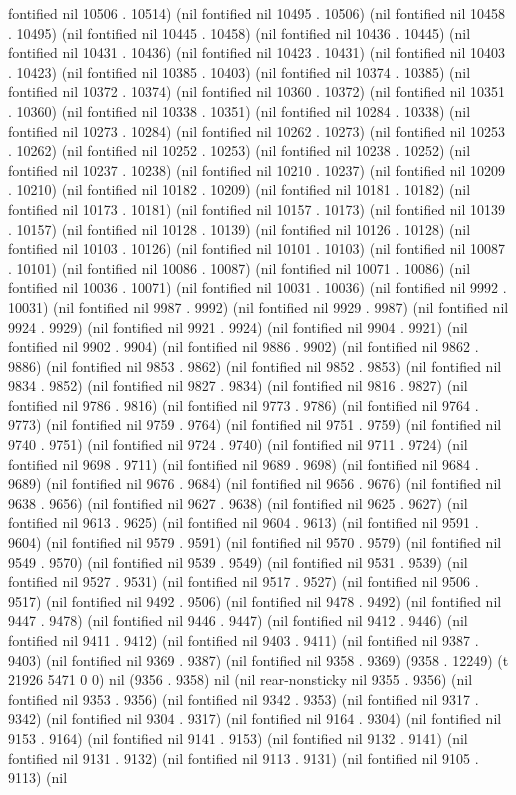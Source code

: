 fontified nil 10506 . 10514) (nil fontified nil 10495 . 10506) (nil fontified nil 10458 . 10495) (nil fontified nil 10445 . 10458) (nil fontified nil 10436 . 10445) (nil fontified nil 10431 . 10436) (nil fontified nil 10423 . 10431) (nil fontified nil 10403 . 10423) (nil fontified nil 10385 . 10403) (nil fontified nil 10374 . 10385) (nil fontified nil 10372 . 10374) (nil fontified nil 10360 . 10372) (nil fontified nil 10351 . 10360) (nil fontified nil 10338 . 10351) (nil fontified nil 10284 . 10338) (nil fontified nil 10273 . 10284) (nil fontified nil 10262 . 10273) (nil fontified nil 10253 . 10262) (nil fontified nil 10252 . 10253) (nil fontified nil 10238 . 10252) (nil fontified nil 10237 . 10238) (nil fontified nil 10210 . 10237) (nil fontified nil 10209 . 10210) (nil fontified nil 10182 . 10209) (nil fontified nil 10181 . 10182) (nil fontified nil 10173 . 10181) (nil fontified nil 10157 . 10173) (nil fontified nil 10139 . 10157) (nil fontified nil 10128 . 10139) (nil fontified nil 10126 . 10128) (nil fontified nil 10103 . 10126) (nil fontified nil 10101 . 10103) (nil fontified nil 10087 . 10101) (nil fontified nil 10086 . 10087) (nil fontified nil 10071 . 10086) (nil fontified nil 10036 . 10071) (nil fontified nil 10031 . 10036) (nil fontified nil 9992 . 10031) (nil fontified nil 9987 . 9992) (nil fontified nil 9929 . 9987) (nil fontified nil 9924 . 9929) (nil fontified nil 9921 . 9924) (nil fontified nil 9904 . 9921) (nil fontified nil 9902 . 9904) (nil fontified nil 9886 . 9902) (nil fontified nil 9862 . 9886) (nil fontified nil 9853 . 9862) (nil fontified nil 9852 . 9853) (nil fontified nil 9834 . 9852) (nil fontified nil 9827 . 9834) (nil fontified nil 9816 . 9827) (nil fontified nil 9786 . 9816) (nil fontified nil 9773 . 9786) (nil fontified nil 9764 . 9773) (nil fontified nil 9759 . 9764) (nil fontified nil 9751 . 9759) (nil fontified nil 9740 . 9751) (nil fontified nil 9724 . 9740) (nil fontified nil 9711 . 9724) (nil fontified nil 9698 . 9711) (nil fontified nil 9689 . 9698) (nil fontified nil 9684 . 9689) (nil fontified nil 9676 . 9684) (nil fontified nil 9656 . 9676) (nil fontified nil 9638 . 9656) (nil fontified nil 9627 . 9638) (nil fontified nil 9625 . 9627) (nil fontified nil 9613 . 9625) (nil fontified nil 9604 . 9613) (nil fontified nil 9591 . 9604) (nil fontified nil 9579 . 9591) (nil fontified nil 9570 . 9579) (nil fontified nil 9549 . 9570) (nil fontified nil 9539 . 9549) (nil fontified nil 9531 . 9539) (nil fontified nil 9527 . 9531) (nil fontified nil 9517 . 9527) (nil fontified nil 9506 . 9517) (nil fontified nil 9492 . 9506) (nil fontified nil 9478 . 9492) (nil fontified nil 9447 . 9478) (nil fontified nil 9446 . 9447) (nil fontified nil 9412 . 9446) (nil fontified nil 9411 . 9412) (nil fontified nil 9403 . 9411) (nil fontified nil 9387 . 9403) (nil fontified nil 9369 . 9387) (nil fontified nil 9358 . 9369) (9358 . 12249) (t 21926 5471 0 0) nil (9356 . 9358) nil (nil rear-nonsticky nil 9355 . 9356) (nil fontified nil 9353 . 9356) (nil fontified nil 9342 . 9353) (nil fontified nil 9317 . 9342) (nil fontified nil 9304 . 9317) (nil fontified nil 9164 . 9304) (nil fontified nil 9153 . 9164) (nil fontified nil 9141 . 9153) (nil fontified nil 9132 . 9141) (nil fontified nil 9131 . 9132) (nil fontified nil 9113 . 9131) (nil fontified nil 9105 . 9113) (nil 